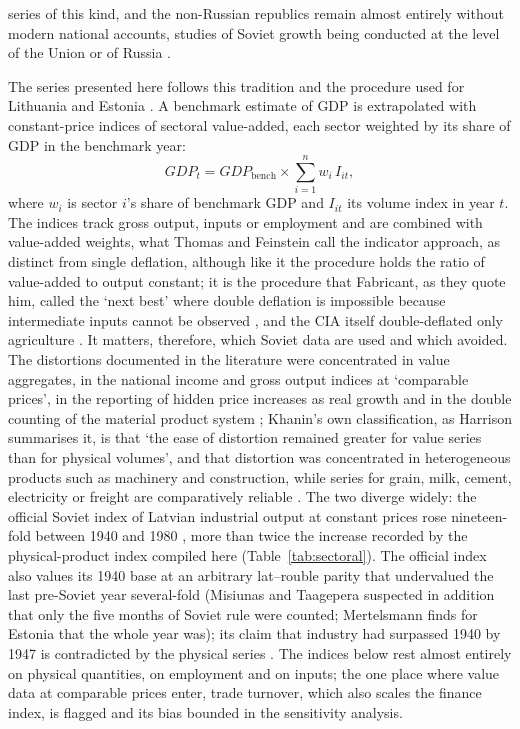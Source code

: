 series of this kind, and the non-Russian republics remain almost entirely without modern national accounts, studies of Soviet growth being conducted at the level of the Union or of Russia \parencites[646, 670--1]{kukic_soviet}{voskoboynikov2021}.

The series presented here follows this tradition and the procedure used for Lithuania and Estonia \parencite{klimantas2026soviet,klimantas2025estonia}. A benchmark estimate of GDP is extrapolated with constant-price indices of sectoral value-added, each sector weighted by its share of GDP in the benchmark year:
\[
    \mathit{GDP}_{t} = \mathit{GDP}_{\mathrm{bench}} \times \sum_{i=1}^{n} w_{i}\, I_{it},
\]
where $w_i$ is sector $i$'s share of benchmark GDP and $I_{it}$ its volume index in year $t$. The indices track gross output, inputs or employment and are combined with value-added weights, what Thomas and Feinstein call the indicator approach, as distinct from single deflation, although like it the procedure holds the ratio of value-added to output constant; it is the procedure that Fabricant, as they quote him, called the `next best' where double deflation is impossible because intermediate inputs cannot be observed \parencite[427--8, 444]{thomasfeinstein2003}, and the CIA itself double-deflated only agriculture \parencite[45]{cia1982a}. It matters, therefore, which Soviet data are used and which avoided. The distortions documented in the literature were concentrated in value aggregates, in the national income and gross output indices at `comparable prices', in the reporting of hidden price increases as real growth and in the double counting of the material product system \parencites[307--8]{Maddison1998b}[6]{vonyo2017}[165]{mertelsmann_2003_there}; Khanin's own classification, as Harrison summarises it, is that `the ease of distortion remained greater for value series than for physical volumes', and that distortion was concentrated in heterogeneous products such as machinery and construction, while series for grain, milk, cement, electricity or freight are comparatively reliable \parencite[144, 152]{harrison1993}. The two diverge widely: the official Soviet index of Latvian industrial output at constant prices rose nineteen-fold between 1940 and 1980 \parencite[361]{years_of_dependence}, more than twice the increase recorded by the physical-product index compiled here (Table~\ref{tab:sectoral}). The official index also values its 1940 base at an arbitrary lat--rouble parity that undervalued the last pre-Soviet year several-fold (Misiunas and Taagepera suspected in addition that only the five months of Soviet rule were counted; Mertelsmann finds for Estonia that the whole year was); its claim that industry had surpassed 1940 by 1947 is contradicted by the physical series \parencites[109]{years_of_dependence}[167]{mertelsmann_2003_there}[234]{krumins_2017_sovetizacijas}. The indices below rest almost entirely on physical quantities, on employment and on inputs; the one place where value data at comparable prices enter, trade turnover, which also scales the finance index, is flagged and its bias bounded in the sensitivity analysis.

